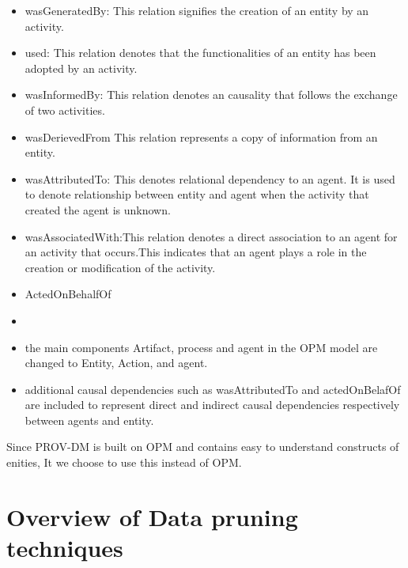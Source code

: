 \begin{itemize}
\item wasGeneratedBy: This relation signifies the creation of an entity by an activity. 

\item used: This relation denotes that the functionalities of an entity has been adopted by an activity.

\item wasInformedBy: This relation denotes an causality that follows the exchange of two activities.

\item wasDerievedFrom This relation represents a copy of information from an entity. 

\item wasAttributedTo: This denotes relational dependency to an agent. It is used to denote relationship between entity and agent when the activity that created the agent is unknown.

\item wasAssociatedWith:This relation denotes a direct association to an agent for an activity that occurs.This indicates that an agent plays a role in the creation or modification of the activity.

\item ActedOnBehalfOf

\item

\end{itemize}

\begin{itemize}

\item the main components Artifact, process and agent in the OPM model are changed to Entity, Action, and agent. 




\item additional causal dependencies such as wasAttributedTo and actedOnBelafOf are included to represent direct and indirect causal dependencies respectively between agents and entity.

\end{itemize}



Since PROV-DM is built on OPM and contains easy to understand constructs of enities, It we choose to use this instead of OPM. 


\section{Overview of Data pruning techniques}

